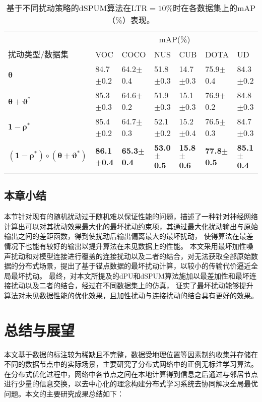\begin{table}[htbp]
    \caption{\label{char4:tab:Perturb_dSSML}基于不同扰动策略的dSPUM算法在LTR$=10\%$时在各数据集上的mAP（\%）表现。}
    \begin{tabularx}{\textwidth}{XXXXXXX}
        \hline
        &   \multicolumn{6}{c}{mAP(\%)} \\ \cline{2-7}
        扰动类型/数据集 & VOC & COCO & NUS & CUB & DOTA & UD \\ \hline
        $\boldsymbol \theta$                         & 84.7$\pm$0.2 & 64.2$\pm$0.4 & 51.8$\pm$0.3 & 14.7$\pm$0.3 & 75.9$\pm$0.4 & 84.3$\pm$0.2\\
        $\boldsymbol \theta+\boldsymbol \vartheta^*$ & 85.3$\pm$0.3 & 64.6$\pm$0.2 & 51.9$\pm$0.3 & 15.1$\pm$0.3 & 76.9$\pm$0.2 & 84.8$\pm$0.3\\
        $\boldsymbol 1-\boldsymbol \rho^*$           & 85.4$\pm$0.2 & 64.7$\pm$0.3 & 52.1$\pm$0.2 & 15.2$\pm$0.4 & 76.5$\pm$0.3 & 84.7$\pm$0.3\\
        $\left(\boldsymbol 1-\boldsymbol \rho^*\right)\circ\left(\boldsymbol \theta+\boldsymbol \vartheta^* \right)$
                                                     & \textbf{86.1$\pm$0.4} & \textbf{65.3$\pm$0.4} & \textbf{53.0$\pm$0.5} & \textbf{15.8$\pm$0.6} & \textbf{77.8$\pm$0.5} & \textbf{85.1$\pm$0.4}\\ \hline
    \end{tabularx}
\end{table}

\section{本章小结}\label{Char4_Summary}
本节针对现有的随机扰动过于随机难以保证性能的问题，描述了一种针对神经网络计算出可以对其扰动效果最大化的最坏扰动约束项，其通过最大化扰动输出与原始输出之间的差距函数，得到使扰动后输出偏离最大的最坏扰动，
使得算法在最差情况下也能有较好的输出以提升算法在未见数据上的性能。
本文采用最坏加性噪声扰动和对模型连接进行覆盖的连接扰动以及二者的结合，对无法获取全部原始数据的分布式场景，提出了基于锚点数据的最坏扰动计算，以较小的传输代价逼近全局最坏扰动。
最终，对本文所提及的dPU和dSPUM算法施加以最差加性和最坏连接扰动以及二者的结合，经过在不同数据集上的仿真，
证实了最坏扰动能够提升算法对未见数据性能的优化效果，且加性扰动与连接扰动的结合具有更好的效果。

\chapter{总结与展望}
本文基于数据的标注较为稀缺且不完整，数据受地理位置等因素制约收集并存储在不同的数据节点中的实际场景，主要研究了分布式网络中的正例无标注学习算法。在分布式优化过程中，网络中各节点之间在本地计算得到信息之后通过与邻居节点进行少量的信息交换，以去中心化的理念构建分布式学习系统去协同解决全局最优问题。本文的主要研究成果总结如下：

